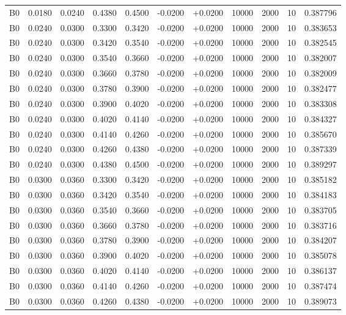 \documentclass{article}
\begin{document}
\begin{longtable}{l r r r r r r r r r l}
B0 & 0.0180 & 0.0240 & 0.4380 & 0.4500 & -0.0200 & +0.0200 & 10000 & 2000 & 10 & 0.387796 \\
B0 & 0.0240 & 0.0300 & 0.3300 & 0.3420 & -0.0200 & +0.0200 & 10000 & 2000 & 10 & 0.383653 \\
B0 & 0.0240 & 0.0300 & 0.3420 & 0.3540 & -0.0200 & +0.0200 & 10000 & 2000 & 10 & 0.382545 \\
B0 & 0.0240 & 0.0300 & 0.3540 & 0.3660 & -0.0200 & +0.0200 & 10000 & 2000 & 10 & 0.382007 \\
B0 & 0.0240 & 0.0300 & 0.3660 & 0.3780 & -0.0200 & +0.0200 & 10000 & 2000 & 10 & 0.382009 \\
B0 & 0.0240 & 0.0300 & 0.3780 & 0.3900 & -0.0200 & +0.0200 & 10000 & 2000 & 10 & 0.382477 \\
B0 & 0.0240 & 0.0300 & 0.3900 & 0.4020 & -0.0200 & +0.0200 & 10000 & 2000 & 10 & 0.383308 \\
B0 & 0.0240 & 0.0300 & 0.4020 & 0.4140 & -0.0200 & +0.0200 & 10000 & 2000 & 10 & 0.384327 \\
B0 & 0.0240 & 0.0300 & 0.4140 & 0.4260 & -0.0200 & +0.0200 & 10000 & 2000 & 10 & 0.385670 \\
B0 & 0.0240 & 0.0300 & 0.4260 & 0.4380 & -0.0200 & +0.0200 & 10000 & 2000 & 10 & 0.387339 \\
B0 & 0.0240 & 0.0300 & 0.4380 & 0.4500 & -0.0200 & +0.0200 & 10000 & 2000 & 10 & 0.389297 \\
B0 & 0.0300 & 0.0360 & 0.3300 & 0.3420 & -0.0200 & +0.0200 & 10000 & 2000 & 10 & 0.385182 \\
B0 & 0.0300 & 0.0360 & 0.3420 & 0.3540 & -0.0200 & +0.0200 & 10000 & 2000 & 10 & 0.384183 \\
B0 & 0.0300 & 0.0360 & 0.3540 & 0.3660 & -0.0200 & +0.0200 & 10000 & 2000 & 10 & 0.383705 \\
B0 & 0.0300 & 0.0360 & 0.3660 & 0.3780 & -0.0200 & +0.0200 & 10000 & 2000 & 10 & 0.383716 \\
B0 & 0.0300 & 0.0360 & 0.3780 & 0.3900 & -0.0200 & +0.0200 & 10000 & 2000 & 10 & 0.384207 \\
B0 & 0.0300 & 0.0360 & 0.3900 & 0.4020 & -0.0200 & +0.0200 & 10000 & 2000 & 10 & 0.385078 \\
B0 & 0.0300 & 0.0360 & 0.4020 & 0.4140 & -0.0200 & +0.0200 & 10000 & 2000 & 10 & 0.386137 \\
B0 & 0.0300 & 0.0360 & 0.4140 & 0.4260 & -0.0200 & +0.0200 & 10000 & 2000 & 10 & 0.387474 \\
B0 & 0.0300 & 0.0360 & 0.4260 & 0.4380 & -0.0200 & +0.0200 & 10000 & 2000 & 10 & 0.389073 \\

\end{longtable}
\end{document}
